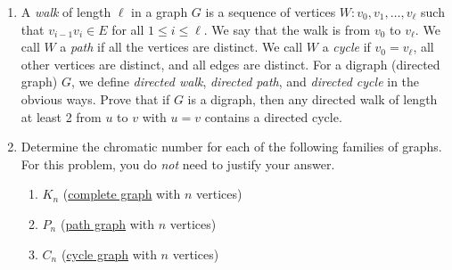 \documentclass[11pt]{article}%
\theoremstyle{definition}
\begin{document}
\begin{enumerate}

\item A \emph{walk} of length $\ell$ in a graph $G$ is a sequence of vertices $W: v_0,v_1,\ldots,v_{\ell}$ such that $v_{i-1}v_i\in E$ for all $1\leq i\leq \ell$.  We say that the walk is from $v_0$ to $v_{\ell}$. We call $W$ a \emph{path} if all the vertices are distinct.  We call $W$ a \emph{cycle} if $v_0=v_{\ell}$, all other vertices are distinct, and all edges are distinct. For a digraph (directed graph) $G$, we define \emph{directed walk}, \emph{directed path}, and \emph{directed cycle} in the obvious ways.  Prove that if $G$ is a digraph, then any directed walk of length at least 2 from $u$ to $v$ with $u=v$ contains a directed cycle.


\item Determine the chromatic number for each of the following families of graphs. For this problem, you do \emph{not} need to justify your answer.
\begin{enumerate}
\item $K_n$ (\href{https://en.wikipedia.org/wiki/Complete_graph}{complete graph} with $n$ vertices)
\item $P_n$ (\href{https://en.wikipedia.org/wiki/Path_graph}{path graph} with $n$ vertices)
\item $C_n$ (\href{https://en.wikipedia.org/wiki/Cycle_graph}{cycle graph} with $n$ vertices)
\end{enumerate}


\end{enumerate}
\end{document}
